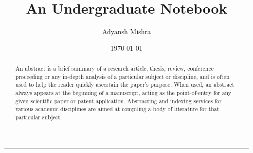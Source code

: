 \documentclass[twoside, a4paper, 10pt]{memoir}
\author{
    Adyansh Mishra \\
    \mailto{adyanshmishra@proton.me}
}\date{\today}
\title{An Undergraduate Notebook}
\begin{document}

\begin{titlingpage}
    \BgThispage
    \vspace*{0.4\textheight}
    \noindent
    \textcolor{white}{\Huge\textbf{\textsf{\thetitle}}}
    \vspace*{2cm}\par
    \noindent
    \begin{minipage}{0.35\linewidth}
        \begin{flushright}
            \printauthor
        \end{flushright}
    \end{minipage} \hspace{15pt}
    \begin{minipage}{0.02\linewidth}
        \rule{1pt}{175pt}
    \end{minipage} \hspace{-10pt}
    \begin{minipage}{0.63\linewidth}
    \vspace{5pt}
        \begin{abstract} 
    An abstract is a brief summary of a research article, thesis, review, conference proceeding or any in-depth analysis of a particular subject or discipline, and is often used to help the reader quickly ascertain the paper's purpose. When used, an abstract always appears at the beginning of a manuscript, acting as the point-of-entry for any given scientific paper or patent application. Abstracting and indexing services for various academic disciplines are aimed at compiling a body of literature for that particular subject.
        \end{abstract}
    \end{minipage}
\end{titlingpage}
    \restoregeometry

    \frontmatter

    \renewcommand*{\contentsname}{Short contents}
    \setcounter{tocdepth}{0}%
    \tableofcontents

    \clearpage
    \renewcommand*{\contentsname}{Contents}
    \setcounter{tocdepth}{1}
    \tableofcontents
    
    \clearpage
    \listoffigures
    \clearpage

    \mainmatter
    \pagestyle{mystyle}
    \setcounter{chapter}{-1}
    
\end{document}

